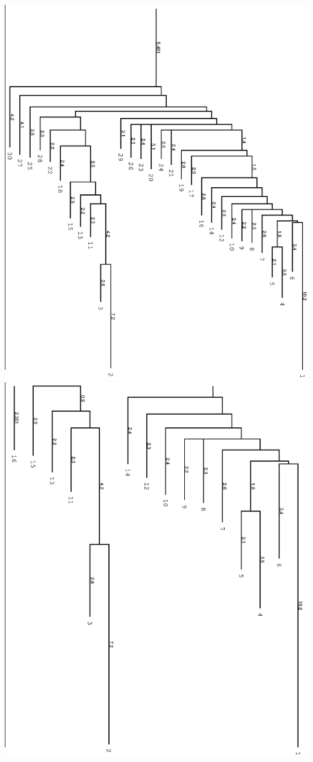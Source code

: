 \documentclass[a4paper]{article}
\begin{document}
\includegraphics[width=.27\textheight]{Figures/switch_barriertree.eps}\hfill
\includegraphics[trim=-1.5cm 0cm 0cm 0cm,width=.27\textheight]{Figures/switch_barriertree_e13.eps}
\end{document}
